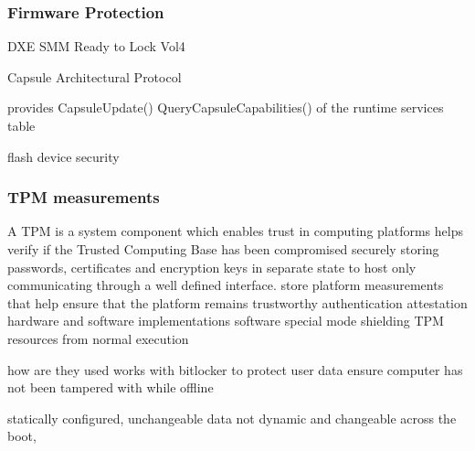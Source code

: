 \subsubsection{Firmware Protection}


DXE SMM Ready to Lock Vol4

Capsule Architectural Protocol

provides
CapsuleUpdate()
QueryCapsuleCapabilities()
of the runtime services table

flash device security

\subsubsection{TPM measurements}
A \acf{TPM} is a system component which enables trust in computing platforms
helps verify if the Trusted Computing Base has been compromised
securely storing passwords, certificates and encryption keys in separate state to host
only communicating through a well defined interface.
store platform measurements that help ensure that the platform remains trustworthy
authentication
attestation
hardware and software implementations
software special mode shielding TPM resources from normal execution
\cite{tcg-tpm-summary}
\cite{tcg-tpm-library-part1-architecture}

how are they used
works with bitlocker to protect user data
ensure computer has not been tampered with while offline

statically configured, unchangeable data
not dynamic and changeable across the boot,
\cite{tianocore-trusted-boot-chain}

